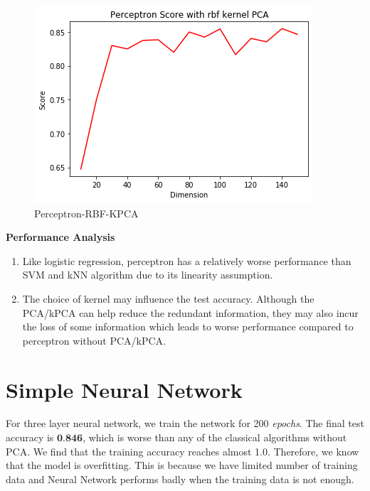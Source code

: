 \documentclass[12pt]{article}
\begin{document}
\begin{figure}[htb]
\begin{minipage}{0.3\textwidth}
		\includegraphics[width=\linewidth]{./exp-figs/P-RBF-KPCA.png}
		\caption{Perceptron-RBF-KPCA}
		\label{fig:P-RBF-KPCA}
	\end{minipage}
\end{figure}

\textbf{Performance Analysis} 
\begin{enumerate}[label=(\roman*)]
	\item Like logistic regression, perceptron has a relatively worse performance than SVM and kNN algorithm due to its linearity assumption.
	\item The choice of kernel may influence the test accuracy. Although the PCA/kPCA can help reduce the redundant information, they may also incur the loss of some information which leads to worse performance compared to perceptron without PCA/kPCA.
\end{enumerate}

\section{Simple Neural Network}
For three layer neural network, we train the network for 200 \emph{epochs}. The final test accuracy is $\textbf{0.846}$, which is worse than any of the classical algorithms without PCA. We find that the training accuracy reaches almost 1.0. Therefore, we know that the model is overfitting. This is because we have limited number of training data and Neural Network performs badly when the training data is not enough.
\end{document}
